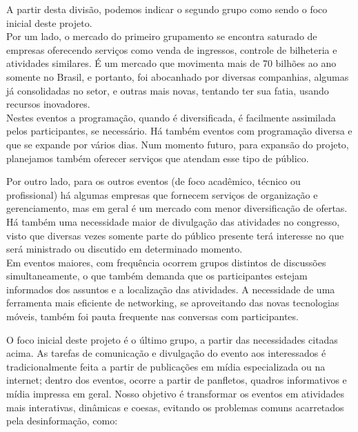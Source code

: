 \documentclass[12pt,a4paper,twoside,hyphens,english,brazil]{abntex2}
\begin{document}
A partir desta divisão, podemos indicar o segundo grupo como sendo o foco inicial deste projeto.\\
Por um lado, o mercado do primeiro grupamento se encontra saturado de empresas oferecendo serviços como venda de ingressos, controle de bilheteria e atividades similares. É um mercado que movimenta mais de 70 bilhões ao ano somente no Brasil\cite{pegn-mercado-eventos}, e portanto, foi abocanhado por diversas companhias, algumas já consolidadas no setor, e outras mais novas, tentando ter sua fatia, usando recursos inovadores.\\
Nestes eventos a programação, quando é diversificada, é facilmente assimilada pelos participantes, se necessário. Há também eventos com programação diversa e que se expande por vários dias. Num momento futuro, para expansão do projeto, planejamos também oferecer serviços que atendam esse tipo de público.

Por outro lado, para os outros eventos (de foco acadêmico, técnico ou profissional) há algumas empresas que fornecem serviços de organização e gerenciamento, mas em geral é um mercado com menor diversificação de ofertas. Há também uma necessidade maior de divulgação das atividades no congresso, visto que diversas vezes somente parte do público presente terá interesse no que será ministrado ou discutido em determinado momento.\\
Em eventos maiores, com frequência ocorrem grupos distintos de discussões simultaneamente, o que também demanda que os participantes estejam informados dos assuntos e a localização das atividades. A necessidade de uma ferramenta mais eficiente de networking, se aproveitando das novas tecnologias móveis, também foi pauta frequente nas conversas com participantes.

O foco inicial deste projeto é o último grupo, a partir das necessidades citadas acima. As tarefas de comunicação e divulgação do evento aos interessados é tradicionalmente feita a partir de publicações em mídia especializada ou na internet; dentro dos eventos, ocorre a partir de panfletos, quadros informativos e mídia impressa em geral. Nosso objetivo é transformar os eventos em atividades mais interativas, dinâmicas e coesas, evitando os problemas comuns acarretados pela desinformação, como:
\end{document}
